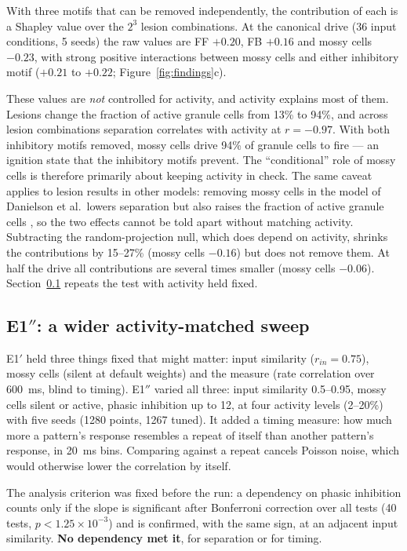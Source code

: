 \documentclass[11pt,a4paper]{article}
\begin{document}
With three motifs that can be removed independently, the contribution of each is
a Shapley value over the $2^3$ lesion combinations. At the canonical drive (36
input conditions, 5 seeds) the raw values are FF $+0.20$, FB $+0.16$ and mossy
cells $-0.23$, with strong positive interactions between mossy cells and either
inhibitory motif ($+0.21$ to $+0.22$; Figure~\ref{fig:findings}c).

These values are \emph{not} controlled for activity, and activity explains most of
them. Lesions change the fraction of active granule cells from 13\% to 94\%, and
across lesion combinations separation correlates with activity at $r=-0.97$. With
both inhibitory motifs removed, mossy cells drive 94\% of granule cells to fire
--- an ignition state that the inhibitory motifs prevent. The ``conditional'' role of mossy cells is
therefore primarily about keeping activity in check. The same caveat applies to
lesion results in other models: removing mossy cells in the model of Danielson et
al.\ lowers separation but also raises the fraction of active granule cells
\cite{danielson2017}, so the two effects cannot be told apart without matching
activity. Subtracting the
random-projection null, which does depend on activity, shrinks the contributions
by 15--27\% (mossy cells $-0.16$) but does not remove them. At half the drive all
contributions are several times smaller (mossy cells $-0.06$). Section~\ref{sec:wide} repeats the test with activity held fixed.

\subsection{E1$''$: a wider activity-matched sweep}
\label{sec:wide}

E1$'$ held three things fixed that might matter: input similarity
($r_{in}=0.75$), mossy cells (silent at default weights) and the measure (rate
correlation over \SI{600}{\milli\second}, blind to timing). E1$''$ varied all
three: input similarity 0.5--0.95, mossy cells silent or active, phasic
inhibition up to 12, at four activity levels (2--20\%) with five seeds (1280
points, 1267 tuned). It added a timing measure: how much more a pattern's response
resembles a repeat of itself than another pattern's response, in \SI{20}{\milli\second}
bins. Comparing against a repeat cancels Poisson noise, which would otherwise
lower the correlation by itself.

The analysis criterion was fixed before the run: a dependency on phasic inhibition
counts only if the slope is significant after Bonferroni correction over all tests
(40 tests, $p<1.25\times10^{-3}$) and is confirmed, with the same sign, at an
adjacent input similarity. \textbf{No dependency met it}, for separation or for
timing.
\end{document}
